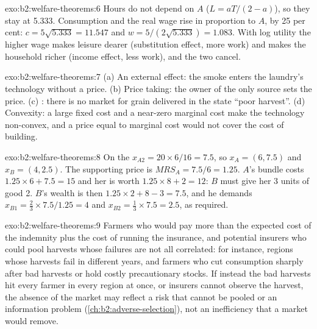 \begin{solution}{exo:b2:welfare-theorems:6}
Hours do not depend on $A$ ($L = aT/(2 - a)$), so they stay at 5.333. Consumption and the real wage rise in
proportion to $A$, by 25 per cent: $c = 5\sqrt{5.333} = 11.547$ and $w = 5/(2\sqrt{5.333}) = 1.083$. With
log utility the higher wage makes leisure dearer (substitution effect, more work) and makes the household
richer (income effect, less work), and the two cancel.
\end{solution}

\begin{solution}{exo:b2:welfare-theorems:7}
(a) An external effect: the smoke enters the laundry's technology without a price. (b) Price taking: the
owner of the only source sets the price. (c) : there is no market for grain delivered
in the state ``poor harvest''. (d) Convexity: a large fixed cost and a near-zero marginal cost make the
technology non-convex, and a price equal to marginal cost would not cover the cost of building.
\end{solution}

\begin{solution}{exo:b2:welfare-theorems:8}
On the  $x_{A2} = 20 \times 6/16 = 7.5$, so $x_A = (6, 7.5)$ and $x_B = (4, 2.5)$. The
supporting price is $\mathit{MRS}_A = 7.5/6 = 1.25$. $A$'s bundle costs $1.25 \times 6 + 7.5 = 15$ and her
 is worth $1.25 \times 8 + 2 = 12$: $B$ must give her 3 units of good 2. $B$'s wealth is then
$1.25 \times 2 + 8 - 3 = 7.5$, and he demands $x_{B1} = \tfrac23 \times 7.5/1.25 = 4$ and $x_{B2} =
\tfrac13 \times 7.5 = 2.5$, as required.
\end{solution}

\begin{solution}{exo:b2:welfare-theorems:9}
Farmers who would pay more than the expected cost of the indemnity plus the cost of running the insurance,
and potential insurers who could pool harvests whose failures are not all correlated: for instance,
regions whose harvests fail in different years, and farmers who cut consumption sharply after bad
harvests or hold costly precautionary stocks. If instead the bad harvests hit every farmer in every region
at once, or insurers cannot observe the harvest, the absence of the market may reflect a risk that cannot
be pooled or an information problem (\cref{ch:b2:adverse-selection}), not an inefficiency that a market
would remove.
\end{solution}

